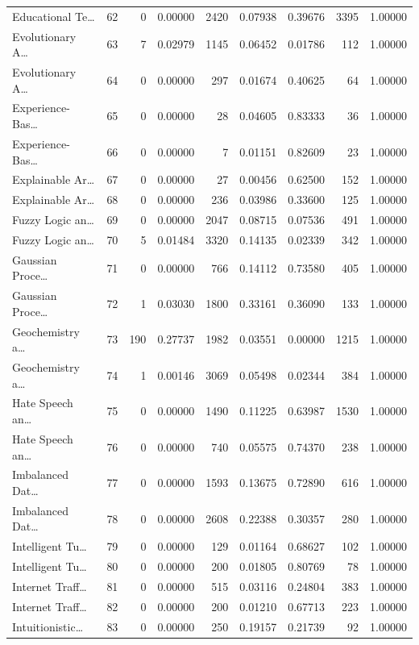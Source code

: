 \begin{table}
\begin{tabular}{lrrrrrrrr}
Educational Te… & 62 & 0 & 0.00000 & 2420 & 0.07938 & 0.39676 & 3395 & 1.00000 \\
Evolutionary A… & 63 & 7 & 0.02979 & 1145 & 0.06452 & 0.01786 & 112 & 1.00000 \\
Evolutionary A… & 64 & 0 & 0.00000 & 297 & 0.01674 & 0.40625 & 64 & 1.00000 \\
Experience-Bas… & 65 & 0 & 0.00000 & 28 & 0.04605 & 0.83333 & 36 & 1.00000 \\
Experience-Bas… & 66 & 0 & 0.00000 & 7 & 0.01151 & 0.82609 & 23 & 1.00000 \\
Explainable Ar… & 67 & 0 & 0.00000 & 27 & 0.00456 & 0.62500 & 152 & 1.00000 \\
Explainable Ar… & 68 & 0 & 0.00000 & 236 & 0.03986 & 0.33600 & 125 & 1.00000 \\
Fuzzy Logic an… & 69 & 0 & 0.00000 & 2047 & 0.08715 & 0.07536 & 491 & 1.00000 \\
Fuzzy Logic an… & 70 & 5 & 0.01484 & 3320 & 0.14135 & 0.02339 & 342 & 1.00000 \\
Gaussian Proce… & 71 & 0 & 0.00000 & 766 & 0.14112 & 0.73580 & 405 & 1.00000 \\
Gaussian Proce… & 72 & 1 & 0.03030 & 1800 & 0.33161 & 0.36090 & 133 & 1.00000 \\
Geochemistry a… & 73 & 190 & 0.27737 & 1982 & 0.03551 & 0.00000 & 1215 & 1.00000 \\
Geochemistry a… & 74 & 1 & 0.00146 & 3069 & 0.05498 & 0.02344 & 384 & 1.00000 \\
Hate Speech an… & 75 & 0 & 0.00000 & 1490 & 0.11225 & 0.63987 & 1530 & 1.00000 \\
Hate Speech an… & 76 & 0 & 0.00000 & 740 & 0.05575 & 0.74370 & 238 & 1.00000 \\
Imbalanced Dat… & 77 & 0 & 0.00000 & 1593 & 0.13675 & 0.72890 & 616 & 1.00000 \\
Imbalanced Dat… & 78 & 0 & 0.00000 & 2608 & 0.22388 & 0.30357 & 280 & 1.00000 \\
Intelligent Tu… & 79 & 0 & 0.00000 & 129 & 0.01164 & 0.68627 & 102 & 1.00000 \\
Intelligent Tu… & 80 & 0 & 0.00000 & 200 & 0.01805 & 0.80769 & 78 & 1.00000 \\
Internet Traff… & 81 & 0 & 0.00000 & 515 & 0.03116 & 0.24804 & 383 & 1.00000 \\
Internet Traff… & 82 & 0 & 0.00000 & 200 & 0.01210 & 0.67713 & 223 & 1.00000 \\
Intuitionistic… & 83 & 0 & 0.00000 & 250 & 0.19157 & 0.21739 & 92 & 1.00000 \\

\end{tabular}
\end{table}
